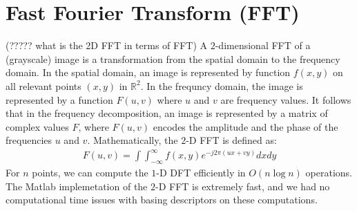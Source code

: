 \documentclass{report}
\begin{document}
\section{Fast Fourier Transform (FFT)} (????? what is the 2D FFT in terms of FFT)
A $2$-dimensional FFT of a (grayscale) image is a transformation from the spatial domain to the frequency domain. In the spatial domain, an image is represented by function $f(x,y)$ on all relevant points $(x,y)$ in  $\mathbb{R}^2$. In the frequncy domain, the image is represented by a function $F(u,v)$ where $u$ and $v$ are frequency values. It follows that in the frequency decomposition, an image is represented by a matrix of complex values $F$, where $F(u,v)$ encodes the amplitude and the phase of the frequencies $u$ and $v$. Mathematically, the $2$-D FFT is defined as:
\begin{eqnarray}
F(u,v) = \int \int ^{\infty}_{-\infty} f(x,y)e^{-j2\pi (ux+vy)}dx dy
\end{eqnarray}
For $n$ points, we can compute the $1$-D DFT efficiently in $O(n\log{n})$ operations. The Matlab implemetation of the $2$-D FFT is extremely  fast, and we had no computational time issues with basing descriptors on these computations.
\end{document}
